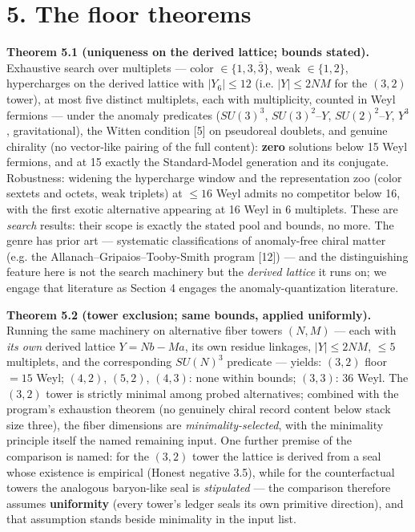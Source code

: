\documentclass[11pt]{article}
\begin{document}
\section*{5. The floor theorems}
\textbf{Theorem 5.1 (uniqueness on the derived lattice; bounds stated).} Exhaustive search over multiplets — color $\in \{1, 3, \bar 3\}$, weak $\in \{1, 2\}$, hypercharges on the derived lattice with $|Y_6| \le 12$ (i.e. $|Y| \le 2NM$ for the $(3,2)$ tower), at most five distinct multiplets, each with multiplicity, counted in Weyl fermions — under the anomaly predicates ($SU(3)^3$, $SU(3)^2$–$Y$, $SU(2)^2$–$Y$, $Y^3$, gravitational), the Witten condition [5] on pseudoreal doublets, and genuine chirality (no vector-like pairing of the full content): \textbf{zero} solutions below 15 Weyl fermions, and at 15 exactly the Standard-Model generation and its conjugate. Robustness: widening the hypercharge window and the representation zoo (color sextets and octets, weak triplets) at $\le 16$ Weyl admits no competitor below 16, with the first exotic alternative appearing at 16 Weyl in 6 multiplets.  These are \emph{search} results: their scope is exactly the stated pool and bounds, no more.  The genre has prior art — systematic classifications of anomaly-free chiral matter (e.g. the Allanach–Gripaios–Tooby-Smith program [12]) — and the distinguishing feature here is not the search machinery but the \emph{derived lattice} it runs on; we engage that literature as Section 4 engages the anomaly-quantization literature.

\textbf{Theorem 5.2 (tower exclusion; same bounds, applied uniformly).} Running the same machinery on alternative fiber towers $(N, M)$ — each with \emph{its own} derived lattice $Y = Nb - Ma$, its own residue linkages, $|Y| \le 2NM$, $\le 5$ multiplets, and the corresponding $SU(N)^3$ predicate — yields: $(3,2)$ floor $= 15$ Weyl; $(4,2)$, $(5,2)$, $(4,3)$: none within bounds; $(3,3)$: $36$ Weyl.  The $(3,2)$ tower is strictly minimal among probed alternatives; combined with the program's exhaustion theorem (no genuinely chiral record content below stack size three), the fiber dimensions are \emph{minimality-selected}, with the minimality principle itself the named remaining input.  One further premise of the comparison is named: for the $(3,2)$ tower the lattice is derived from a seal whose existence is empirical (Honest negative 3.5), while for the counterfactual towers the analogous baryon-like seal is \emph{stipulated} — the comparison therefore assumes \textbf{uniformity} (every tower's ledger seals its own primitive direction), and that assumption stands beside minimality in the input list.
\end{document}
